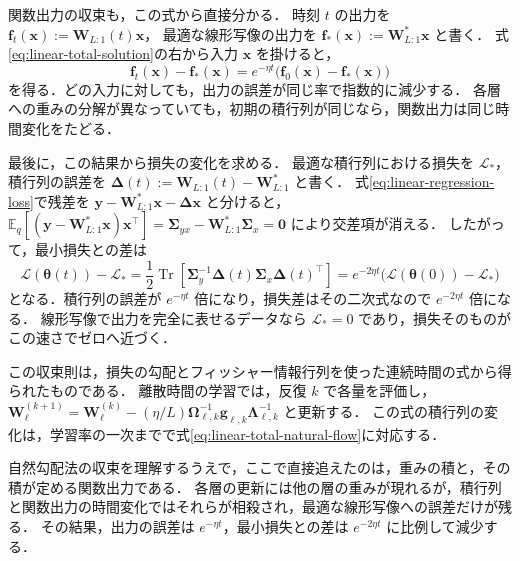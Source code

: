 \documentclass[../main.tex]{subfiles}
\begin{document}
関数出力の収束も，この式から直接分かる．
時刻 $t$ の出力を $\bm{f}_t(\bm{x}):=\bm{W}_{L:1}(t)\bm{x}$，
最適な線形写像の出力を $\bm{f}_*(\bm{x}):=\bm{W}_{L:1}^*\bm{x}$ と書く．
式\eqref{eq:linear-total-solution}の右から入力 $\bm{x}$ を掛けると，
\begin{equation}
  \bm{f}_t(\bm{x})-\bm{f}_*(\bm{x})
  =e^{-\eta t}
  \bigl(\bm{f}_0(\bm{x})-\bm{f}_*(\bm{x})\bigr)
  \label{eq:linear-output-solution}
\end{equation}
を得る．どの入力に対しても，出力の誤差が同じ率で指数的に減少する．
各層への重みの分解が異なっていても，初期の積行列が同じなら，関数出力は同じ時間変化をたどる．

最後に，この結果から損失の変化を求める．
最適な積行列における損失を $\mathcal{L}_*$，
積行列の誤差を $\bm{\Delta}(t):=\bm{W}_{L:1}(t)-\bm{W}_{L:1}^*$ と書く．
式\eqref{eq:linear-regression-loss}で残差を
$\bm{y}-\bm{W}_{L:1}^*\bm{x}-\bm{\Delta}\bm{x}$ と分けると，
$\mathbb{E}_q[(\bm{y}-\bm{W}_{L:1}^*\bm{x})\bm{x}^\top]
=\bm{\Sigma}_{yx}-\bm{W}_{L:1}^*\bm{\Sigma}_{x}=\bm{0}$ により交差項が消える．
したがって，最小損失との差は
\begin{equation}
  \mathcal{L}(\bm{\theta}(t))-\mathcal{L}_*
  =\frac12\operatorname{Tr}\!\left[
  \bm{\Sigma}_{y}^{-1}\bm{\Delta}(t)
  \bm{\Sigma}_{x}\bm{\Delta}(t)^\top\right]
  =e^{-2\eta t}
  \bigl(\mathcal{L}(\bm{\theta}(0))-\mathcal{L}_*\bigr)
  \label{eq:linear-loss-solution}
\end{equation}
となる．積行列の誤差が $e^{-\eta t}$ 倍になり，損失差はその二次式なので $e^{-2\eta t}$ 倍になる．
線形写像で出力を完全に表せるデータなら $\mathcal{L}_*=0$ であり，損失そのものがこの速さでゼロへ近づく．

この収束則は，損失の勾配とフィッシャー情報行列を使った連続時間の式から得られたものである．
離散時間の学習では，反復 $k$ で各量を評価し，
$\bm{W}_\ell^{(k+1)}=\bm{W}_\ell^{(k)}
-(\eta/L)\bm{\Omega}_{\ell,k}^{-1}\bm{g}_{\ell,k}\bm{\Lambda}_{\ell,k}^{-1}$ と更新する．
この式の積行列の変化は，学習率の一次までで式\eqref{eq:linear-total-natural-flow}に対応する．

\begin{samepage}
自然勾配法の収束を理解するうえで，ここで直接追えたのは，重みの積と，その積が定める関数出力である．
各層の更新には他の層の重みが現れるが，積行列と関数出力の時間変化ではそれらが相殺され，最適な線形写像への誤差だけが残る．
その結果，出力の誤差は $e^{-\eta t}$，最小損失との差は $e^{-2\eta t}$ に比例して減少する．
\par
\end{samepage}
\end{document}
